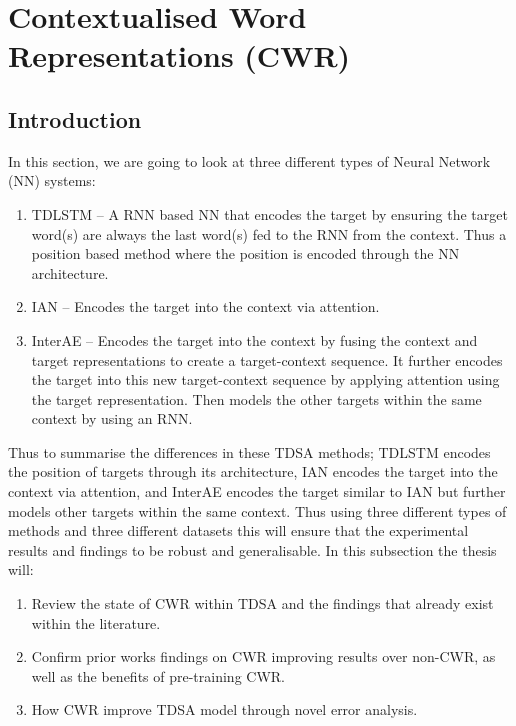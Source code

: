 \section{Contextualised Word Representations (CWR)}
\subsection{Introduction}

In this section, we are going to look at three different types of Neural Network (NN) systems:
\begin{enumerate}
    \item TDLSTM -- A RNN based NN that encodes the target by ensuring the target word(s) are always the last word(s) fed to the RNN from the context. Thus a position based method where the position is encoded through the NN architecture.
    \item IAN -- Encodes the target into the context via attention.
    \item InterAE -- Encodes the target into the context by fusing the context and target representations to create a target-context sequence. It further encodes the target into this new target-context sequence by applying attention using the target representation. Then models the other targets within the same context by using an RNN.  
\end{enumerate}
Thus to summarise the differences in these TDSA methods; TDLSTM encodes the position of targets through its architecture, IAN encodes the target into the context via attention, and InterAE encodes the target similar to IAN but further models other targets within the same context. Thus using three different types of methods and three different datasets this will ensure that the experimental results and findings to be robust and generalisable. In this subsection the thesis will: 
\begin{enumerate}
    \item Review the state of CWR within TDSA and the findings that already exist within the literature. 
    \item Confirm prior works findings on CWR improving results over non-CWR, as well as the benefits of pre-training CWR.
    \item How CWR improve TDSA model through novel error analysis.
\end{enumerate}
  

